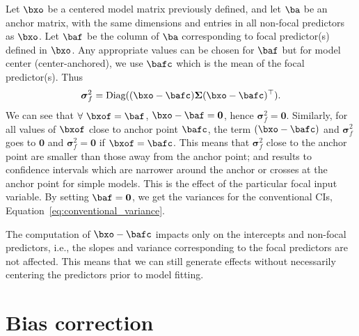Let $\bxo$ be a centered model matrix previously defined, and let $\ba$ be an anchor matrix, with the same dimensions and entries in all non-focal predictors as $\bxo$. Let $\baf$ be the column of $\ba$ corresponding to focal predictor(s) defined in $\bxo$. Any appropriate values can be chosen for $\baf$ but for model center (center-anchored), we use $\bafc$ which is the mean of the focal predictor(s). Thus 
%
\begin{align}\label{eq:centered_variance}
\boldsymbol\sigma_f^2 = \textrm{Diag}((\bxo - \bafc) \boldsymbol{\Sigma} (\bxo - \bafc)^\top).
\end{align}
%
We can see that $\forall ~\bxof=\baf$, $\bxo - \baf = \boldsymbol 0$, hence $\boldsymbol\sigma_f^2 = \boldsymbol{0}$. Similarly, for all values of $\bxof$ close to anchor point $\bafc$, the term $(\bxo - \bafc)$ and $\boldsymbol\sigma_f^2$ goes to $\boldsymbol 0$ and $\boldsymbol\sigma_f^2 = \boldsymbol 0$ if $\bxof=\bafc$. This means that $\boldsymbol\sigma_f^2$ close to the anchor point are smaller than those away from the anchor point; and results to confidence intervals which are narrower around the anchor or crosses at the anchor point for simple models. This is the effect of the particular focal input variable. By setting $\baf = \boldsymbol 0$, we get the variances for the conventional CIs, Equation~\ref{eq:conventional_variance}.


The computation of $\bxo - \bafc$ impacts only on the intercepts and non-focal predictors, i.e., the slopes and variance corresponding to the focal predictors are not affected. This means that we can still generate effects without necessarily centering the predictors prior to model fitting.


\section{Bias correction}

